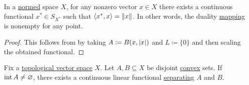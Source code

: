 \begin{Corollary}\label{thm:hahn_banach_implies_duality_mapping_nonempty}\cite[25]{Йоффе1974}
  In a \hyperref[def:norm]{normed} space \( X \), for any nonzero vector \( x \in X \) there exists a continuous functional \( x^* \in S_{X^*} \) such that \( \left\langle x^*, x \right\rangle = \left\Vert x \right\Vert \). In other words, the duality \hyperref[def:duality_mapping]{mapping} is nonempty for any point.
\end{Corollary}
\begin{proof}
  This follows from  by taking \( A \coloneqq B(x, \left\vert x \right\vert) \) and \( L \coloneqq \{ 0 \} \) and then scaling the obtained functional.
\end{proof}

\begin{Theorem}\label{thm:hahn_banach_hyperplane_separation}\cite[25]{Йоффе1974}
  Fix a \hyperref[def:topological_vector_space]{topological vector space} \( X \). Let \( A, B \subseteq X \) be disjoint \hyperref[def:convex_set]{convex} sets. If \( \operatorname{int}{A} \neq \varnothing \), there exists a continuous linear functional \hyperref[def:hyperplane_separation]{separating} \( A \) and \( B \).
\end{Theorem}
